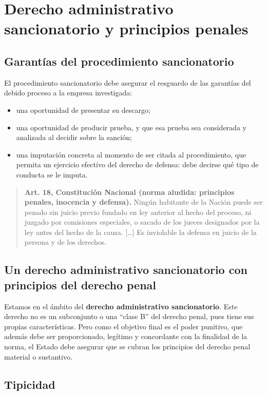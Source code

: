 \documentclass[12pt,oneside]{book}
\begin{document}
\section{Derecho administrativo sancionatorio y principios penales}

\subsection{Garantías del procedimiento sancionatorio}

El procedimiento sancionatorio debe asegurar el resguardo de las garantías del debido proceso a la empresa investigada:
\begin{itemize}
    \item una oportunidad de presentar su descargo;
    \item una oportunidad de producir prueba, y que esa prueba sea considerada y analizada al decidir sobre la sanción;
    \item una imputación concreta al momento de ser citada al procedimiento, que permita un ejercicio efectivo del derecho de defensa: debe decirse qué tipo de conducta se le imputa.
\end{itemize}

\begin{quote}
\textbf{Art. 18, Constitución Nacional (norma aludida: principios penales, inocencia y defensa).} Ningún habitante de la Nación puede ser penado sin juicio previo fundado en ley anterior al hecho del proceso, ni juzgado por comisiones especiales, o sacado de los jueces designados por la ley antes del hecho de la causa. [\ldots] Es inviolable la defensa en juicio de la persona y de los derechos.
\end{quote}

\subsection{Un derecho administrativo sancionatorio con principios del derecho penal}

Estamos en el ámbito del \textbf{derecho administrativo sancionatorio}. Este derecho no es un subconjunto o una ``clase B'' del derecho penal, pues tiene sus propias características. Pero como el objetivo final es el poder punitivo, que además debe ser proporcionado, legítimo y concordante con la finalidad de la norma, el Estado debe asegurar que se cubran los principios del derecho penal material o sustantivo.

\subsection{Tipicidad}
\end{document}

